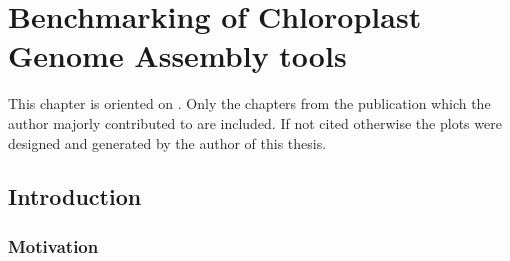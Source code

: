 \newcommand{\formatprogramnames}[1]{\texttt{#1}}
\newcommand{\ce}{\formatprogramnames{chloroExtractor}}
\newcommand{\oa}{\formatprogramnames{ORG.Asm}}
\newcommand{\fp}{\formatprogramnames{Fast-Plast}}
\newcommand{\ioga}{\formatprogramnames{IOGA}}
\newcommand{\np}{\formatprogramnames{NOVOPlasty}}
\newcommand{\go}{\formatprogramnames{GetOrganelle}}
\newcommand{\cassp}{\formatprogramnames{Chloroplast assembly protocol}}



\chapter{Benchmarking of Chloroplast Genome Assembly tools } %

\label{Chapter1} %
This chapter is oriented on \cite{freudenthal2019landscape}. Only the chapters from the
publication which the author majorly contributed to are included. If not cited otherwise
the plots were designed and generated by the author of this thesis.


\newcommand{\keyword}[1]{\textbf{#1}}
\newcommand{\tabhead}[1]{\textbf{#1}}
\newcommand{\code}[1]{\texttt{#1}}
\newcommand{\file}[1]{\texttt{\bfseries#1}}
\newcommand{\option}[1]{\texttt{\itshape#1}}


\section{Introduction} \label{intro:cp}
\subsection{Motivation}

